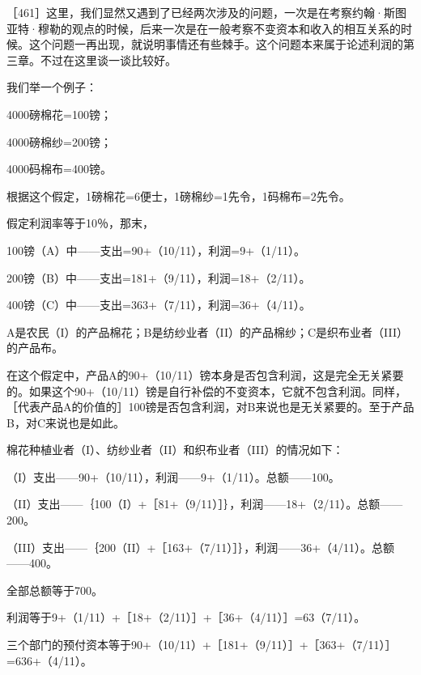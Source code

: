 ［461］这里，我们显然又遇到了已经两次涉及的问题，一次是在考察约翰·斯图亚特·穆勒的观点的时候，后来一次是在一般考察不变资本和收入的相互关系的时候。这个问题一再出现，就说明事情还有些棘手。这个问题本来属于论述利润的第三章。不过在这里谈一谈比较好。

我们举一个例子：

4000磅棉花=100镑；

4000磅棉纱=200镑；

4000码棉布=400镑。

根据这个假定，1磅棉花=6便士，1磅棉纱=1先令，1码棉布=2先令。

假定利润率等于10％，那末，

100镑（A）中——支出=90+（10/11），利润=9+（1/11）。

200镑（B）中——支出=181+（9/11），利润=18+（2/11）。

400镑（C）中——支出=363+（7/11），利润=36+（4/11）。

A是农民（I）的产品棉花；B是纺纱业者（II）的产品棉纱；C是织布业者（III）的产品布。

在这个假定中，产品A的90+（10/11）镑本身是否包含利润，这是完全无关紧要的。如果这个90+（10/11）镑是自行补偿的不变资本，它就不包含利润。同样，［代表产品A的价值的］100镑是否包含利润，对B来说也是无关紧要的。至于产品B，对C来说也是如此。

棉花种植业者（I）、纺纱业者（II）和织布业者（III）的情况如下：

（I）支出——90+（10/11），利润——9+（1/11）。总额——100。

（II）支出——｛100（I）+［81+（9/11）］｝，利润——18+（2/11）。总额——200。

（III）支出——｛200（II）+［163+（7/11）］｝，利润——36+（4/11）。总额——400。

全部总额等于700。

利润等于9+（1/11）+［18+（2/11）］+［36+（4/11）］=63（7/11）。

三个部门的预付资本等于90+（10/11）+［181+（9/11）］+［363+（7/11）］=636+（4/11）。

